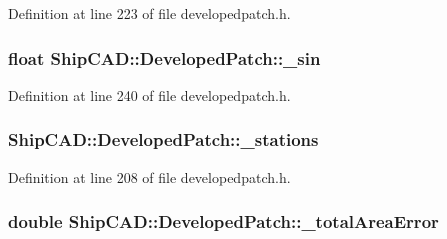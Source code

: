 Definition at line 223 of file developedpatch.\+h.

\subsubsection[{\texorpdfstring{\+\_\+sin}{_sin}}]{\setlength{\rightskip}{0pt plus 5cm}float Ship\+C\+A\+D\+::\+Developed\+Patch\+::\+\_\+sin\hspace{0.3cm}{\ttfamily [protected]}}\hypertarget{classShipCAD_1_1DevelopedPatch_aad8361f99a45d4fa04450828e0e177d0}{}\label{classShipCAD_1_1DevelopedPatch_aad8361f99a45d4fa04450828e0e177d0}


Definition at line 240 of file developedpatch.\+h.

\subsubsection[{\texorpdfstring{\+\_\+stations}{_stations}}]{ Ship\+C\+A\+D\+::\+Developed\+Patch\+::\+\_\+stations\hspace{0.3cm}{\ttfamily [protected]}}\hypertarget{classShipCAD_1_1DevelopedPatch_a61db759391d5f9d542dfe4551e2406ca}{}\label{classShipCAD_1_1DevelopedPatch_a61db759391d5f9d542dfe4551e2406ca}


Definition at line 208 of file developedpatch.\+h.

\subsubsection[{\texorpdfstring{\+\_\+total\+Area\+Error}{_totalAreaError}}]{\setlength{\rightskip}{0pt plus 5cm}double Ship\+C\+A\+D\+::\+Developed\+Patch\+::\+\_\+total\+Area\+Error\hspace{0.3cm}{\ttfamily [protected]}}\hypertarget{classShipCAD_1_1DevelopedPatch_ace1b56968ee580af5a6776bdc5d67d59}{}\label{classShipCAD_1_1DevelopedPatch_ace1b56968ee580af5a6776bdc5d67d59}


